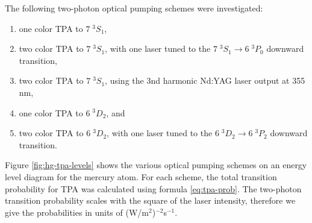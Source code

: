 The following two-photon optical pumping schemes were investigated: 
\renewcommand{\theenumi}{(\alph{enumi})}
\renewcommand{\labelenumi}{\theenumi}
\begin{enumerate}
  \item one color TPA to $7 \; ^3S_1$,
  \item two color TPA to $7 \; ^3S_1$, with one laser tuned to the
    $7 \; ^3S_1 \rightarrow 6 \; ^3P_0$ downward transition,
  \item two color TPA to $7 \; ^3S_1$, using the  3nd harmonic Nd:YAG
    laser output at 355 nm,
  \item one color TPA to $6 \; ^3D_2$, and
  \item two color TPA to $6 \; ^3D_2$, with one laser tuned to the
    $6 \; ^3D_2 \rightarrow 6 \; ^3P_2$ downward transition.
\end{enumerate}
Figure \ref{fig:hg-tpa-levels} shows the various optical pumping
schemes on an energy level diagram for the mercury atom.  For each
scheme, the total transition probability for TPA was calculated using
formula \ref{eq:tpa-prob}.  The two-photon transition probability
scales with the square of the laser intensity, therefore we give the
probabilities in units of (W/m$^2$)$^{-2}$s$^{-1}$.

